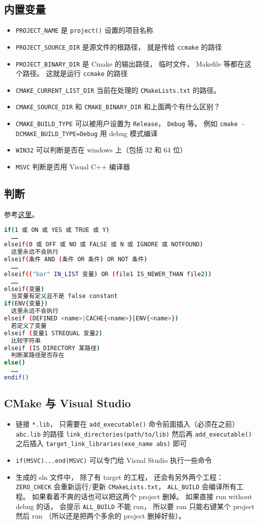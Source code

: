 \subsection{内置变量}
\begin{itemize}
\item \verb|PROJECT_NAME| 是 \verb|project()| 设置的项目名称
\item \verb`PROJECT_SOURCE_DIR` 是源文件的根路径， 就是传给 \verb`ccmake` 的路径
\item \verb`PROJECT_BINARY_DIR` 是 Cmake 的输出路径， 临时文件， Makefile 等都在这个路径。 这就是运行 \verb`ccmake` 的路径
\item \verb|CMAKE_CURRENT_LIST_DIR| 当前在处理的 \verb|CMakeLists.txt| 的路径。
\item \verb|CMAKE_SOURCE_DIR| 和 \verb|CMAKE_BINARY_DIR| 和上面两个有什么区别？
\item \verb|CMAKE_BUILD_TYPE| 可以被用户设置为 \verb|Release|， \verb|Debug| 等。 例如 \verb|cmake -DCMAKE_BUILD_TYPE=Debug| 用 debug 模式编译
\item \verb|WIN32| 可以判断是否在 windows 上（包括 32 和 64 位）
\item \verb|MSVC| 判断是否用 Visual C++ 编译器
\end{itemize}

\subsection{判断}
参考\href{https://cmake.org/cmake/help/latest/command/if.html}{这里}。
\begin{lstlisting}[language=bash]
if(1 或 ON 或 YES 或 TRUE 或 Y)
  ……
elseif(0 或 OFF 或 NO 或 FALSE 或 N 或 IGNORE 或 NOTFOUND)
  这里永远不会执行
elseif(条件 AND (条件 OR 条件) OR NOT 条件)
  ……
elseif(("bar" IN_LIST 变量) OR (file1 IS_NEWER_THAN file2))
  ……
elseif(变量)
  当变量有定义且不是 false constant
if(ENV{变量})
  这里永远不会执行
elseif (DEFINED <name>|CACHE{<name>}|ENV{<name>})
  若定义了变量
elseif (变量1 STREQUAL 变量2)
  比较字符串
elseif (IS_DIRECTORY 某路径)
  判断某路径是否存在
else()
  ……
endif()
\end{lstlisting}

\subsection{CMake 与 Visual Studio}
\begin{itemize}
\item 链接 \verb`*.lib`， 只需要在 \verb`add_executable()` 命令前面插入（必须在之前） \verb`abc.lib` 的路径 \verb`link_directories(path/to/lib)` 然后再 \verb`add_executable()` 之后插入 \verb`target_link_libraries(exe_name abs)` 即可
\item \verb`if(MSVC)...end(MSVC)` 可以专门给 Visual Studio 执行一些命令
\item 生成的 sln 文件中， 除了有 target 的工程， 还会有另外两个工程： \verb`ZERO_CHECK` 会重新运行/更新 \verb`CMakeLists.txt`， \verb`ALL_BUILD` 会编译所有工程。 如果看着不爽的话也可以把这两个 project 删掉。 如果直接 run without debug 的话， 会提示 \verb`ALL_BUILD` 不能 run， 所以要 run 只能右键某个 project 然后 run （所以还是把两个多余的 project 删掉好些）。
\end{itemize}

